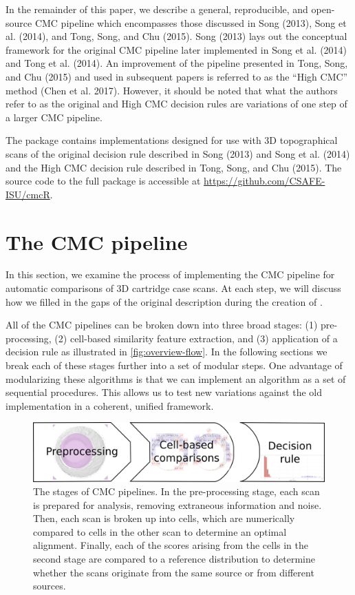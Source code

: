 In the remainder of this paper, we describe a general, reproducible, and open-source CMC pipeline which encompasses those discussed in Song (2013), Song et al. (2014), and Tong, Song, and Chu (2015).
Song (2013) lays out the conceptual framework for the original CMC pipeline later implemented in Song et al. (2014) and Tong et al. (2014).
An improvement of the pipeline presented in Tong, Song, and Chu (2015) and used in subsequent papers is referred to as the ``High CMC'' method (Chen et al. 2017). However, it should be noted that what the authors refer to as the original and High CMC decision rules are variations of one step of a larger CMC pipeline.

The  package contains implementations designed for use with 3D topographical scans of the original decision rule described in Song (2013) and Song et al. (2014) and the High CMC decision rule described in Tong, Song, and Chu (2015).
The source code to the full  package is accessible at \url{https://github.com/CSAFE-ISU/cmcR}.

\hypertarget{cmcMethod}{%
\section{The CMC pipeline}\label{cmcMethod}}

In this section, we examine the process of implementing the CMC pipeline for automatic comparisons of 3D cartridge case scans.
At each step, we will discuss how we filled in the gaps of the original description during the creation of .

All of the CMC pipelines can be broken down into three broad stages: (1) pre-processing, (2) cell-based similarity feature extraction, and (3) application of a decision rule as illustrated in \autoref{fig:overview-flow}.
In the following sections we break each of these stages further into a set of modular steps.
One advantage of modularizing these algorithms is that we can implement an algorithm as a set of sequential procedures.
This allows us to test new variations against the old implementation in a coherent, unified framework.

\begin{figure}[htbp]
\includegraphics[width=\textwidth]{images/overview-flow} \caption{The stages of CMC pipelines. In the pre-processing stage, each scan is prepared for analysis, removing extraneous information and noise. Then, each scan is broken up into cells, which are numerically compared to cells in the other scan to determine an optimal alignment. Finally, each of the scores arising from the cells in the second stage are compared to a reference distribution to determine whether the scans originate from the same source or from different sources.}\label{fig:overview-flow}
\end{figure}

